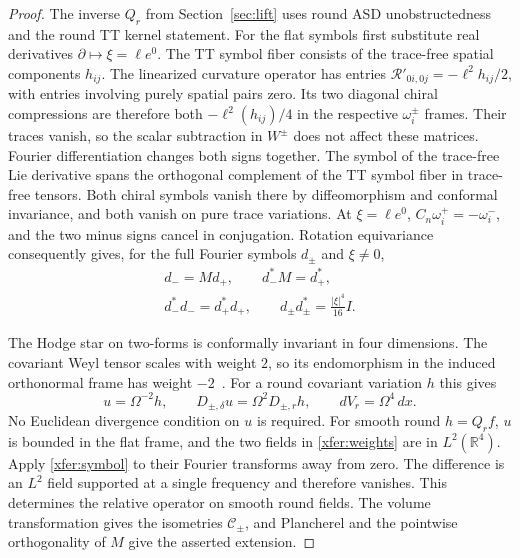 \documentclass[11pt]{article}
\numberwithin{equation}{section}
\theoremstyle{definition}
\theoremstyle{remark}
\begin{document}
\begin{proof}
The inverse \(Q_r\) from Section~\ref{sec:lift} uses round ASD
unobstructedness~\cite[\S1.1]{GoverGursky2024} and the round TT
kernel statement. For the flat symbols first substitute real
derivatives \(\partial\mapsto\xi=\ell e^0\). The TT symbol
fiber consists of the trace-free spatial components \(h_{ij}\).
The linearized curvature operator has entries
\(\mathcal R'_{0i,0j}=-\ell^2h_{ij}/2\), with entries involving
purely spatial pairs zero. Its two diagonal chiral compressions
are therefore both \(-\ell^2(h_{ij})/4\) in the respective
\(\omega_i^\pm\) frames. Their traces vanish, so the scalar
subtraction in \(W^\pm\) does not affect these matrices.
Fourier differentiation changes both signs together.
The symbol of the trace-free Lie derivative spans the
orthogonal complement of the TT symbol fiber in trace-free
tensors. Both chiral symbols vanish there by diffeomorphism and
conformal invariance, and both vanish on pure trace variations.
At \(\xi=\ell e^0\), \(C_n\omega_i^+=-\omega_i^-\), and the two minus
signs cancel in conjugation. Rotation equivariance consequently gives,
for the full Fourier symbols \(d_\pm\) and \(\xi\ne0\),
\begin{equation}\label{xfer:symbol}
 \begin{gathered}
 d_-=M d_+,\qquad d_-^*M=d_+^*,\\
 d_-^*d_-=d_+^*d_+,\qquad d_\pm d_\pm^*=\tfrac{|\xi|^4}{16}I .
 \end{gathered}
\end{equation}

The Hodge star on two-forms is conformally invariant in four
dimensions. The covariant Weyl tensor scales with weight \(2\),
so its endomorphism in the induced orthonormal frame has
weight \(-2\)~\cite[Ch.~6]{FeffermanGraham2008Ambient}. For a
round covariant variation \(h\) this gives
\begin{equation}\label{xfer:weights}
 u=\Omega^{-2}h,\qquad D_{\pm,\delta}u=\Omega^2D_{\pm,r}h,
 \qquad dV_r=\Omega^4\,dx .
\end{equation}
No Euclidean divergence condition on \(u\) is required. For smooth
round \(h=Q_r f\), \(u\) is bounded in the flat frame, and the two
fields in \eqref{xfer:weights} are in \(L^2(\mathbb R^4)\).
Apply \eqref{xfer:symbol} to their Fourier transforms away from
zero. The difference is an \(L^2\) field supported at a single
frequency and therefore vanishes. This determines the relative
operator on smooth round fields. The volume transformation gives
the isometries \(\mathcal C_\pm\), and Plancherel and the
pointwise orthogonality of \(M\) give the asserted extension.
\end{proof}
\end{document}
